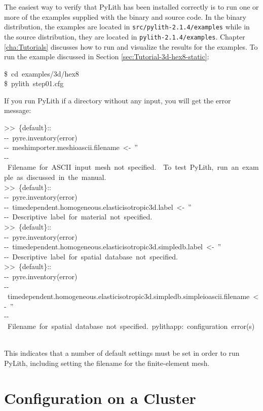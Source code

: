 The easiest way to verify that PyLith has been installed correctly
is to run one or more of the examples supplied with the binary and
source code. In the binary distribution, the examples are located
in \texttt{src/pylith-2.1.4/examples} while in the source distribution,
they are located in \texttt{pylith-2.1.4/examples}. Chapter \ref{cha:Tutorials}
discusses how to run and visualize the results for the examples. To
run the example discussed in Section \ref{sec:Tutorial-3d-hex8-static}:
\begin{lyxcode}
\$~cd~examples/3d/hex8~\\
\$~pylith~step01.cfg
\end{lyxcode}
If you run PyLith if a directory without any input, you will get the
error message:
\begin{lyxcode}
>\textcompwordmark{}>~\{default\}::~~~\\
-{}-~pyre.inventory(error)~~~\\
-{}-~meshimporter.meshioascii.filename~<-~''~~~\\
-{}-~Filename~for~ASCII~input~mesh~not~specified.~~To~test~PyLith,~run~an~example~as~discussed~in~the~manual.~~~\\
>\textcompwordmark{}>~\{default\}::~~~\\
-{}-~pyre.inventory(error)~~~\\
-{}-~timedependent.homogeneous.elasticisotropic3d.label~<-~''~~~\\
-{}-~Descriptive~label~for~material~not~specified.~~~\\
>\textcompwordmark{}>~\{default\}::~~~\\
-{}-~pyre.inventory(error)~~~\\
-{}-~timedependent.homogeneous.elasticisotropic3d.simpledb.label~<-~''~~~\\
-{}-~Descriptive~label~for~spatial~database~not~specified.~~~\\
>\textcompwordmark{}>~\{default\}::~~~\\
-{}-~pyre.inventory(error)~~~\\
-{}-~timedependent.homogeneous.elasticisotropic3d.simpledb.simpleioascii.filename~<-~''~~~\\
-{}-~Filename~for~spatial~database~not~specified.~pylithapp:~configuration~error(s)~~
\end{lyxcode}
This indicates that a number of default settings must be set in order
to run PyLith, including setting the filename for the finite-element
mesh.


\section{Configuration on a Cluster}

